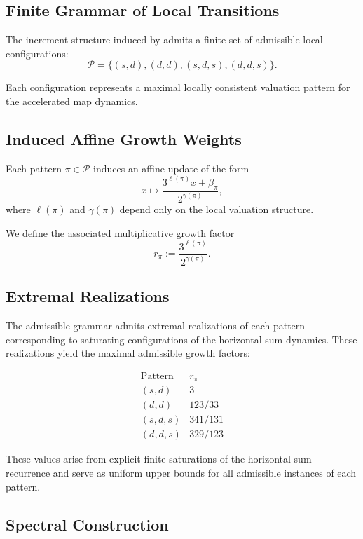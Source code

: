 \documentclass[12pt, oneside]{article}
\numberwithin{equation}{section}
\theoremstyle{definition}
\theoremstyle{plain}
\theoremstyle{remark}
\begin{document}
\subsection{Finite Grammar of Local Transitions}

The increment structure induced by  admits a finite set of
admissible local configurations:
\[
\mathcal{P} = \{ (s,d), (d,d), (s,d,s), (d,d,s) \}.
\]

Each configuration represents a maximal locally consistent valuation pattern
for the accelerated map dynamics.

\subsection{Induced Affine Growth Weights}

Each pattern $\pi \in \mathcal{P}$ induces an affine update of the form
\[
x \mapsto \frac{3^{\ell(\pi)} x + \beta_\pi}{2^{\gamma(\pi)}},
\]
where $\ell(\pi)$ and $\gamma(\pi)$ depend only on the local valuation structure.

We define the associated multiplicative growth factor
\[
r_\pi := \frac{3^{\ell(\pi)}}{2^{\gamma(\pi)}}.
\]

\subsection{Extremal Realizations}

The admissible grammar admits extremal realizations of each pattern
corresponding to saturating configurations of the horizontal-sum dynamics.
These realizations yield the maximal admissible growth factors:

\[
\begin{array}{c|c}
\text{Pattern} & r_\pi \\
\hline
(s,d) & 3 \\
(d,d) & 123 / 33 \\
(s,d,s) & 341 / 131 \\
(d,d,s) & 329 / 123
\end{array}
\]

These values arise from explicit finite saturations of the horizontal-sum
recurrence and serve as uniform upper bounds for all admissible instances
of each pattern.

\subsection{Spectral Construction}
\end{document}
